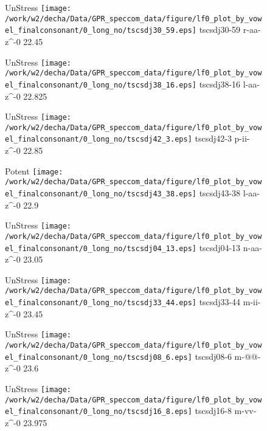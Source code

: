 \documentclass{article}
\begin{document}
\begin{figure}[t]
\begin{minipage}[b]{.24\textwidth}
UnStress
\centering
\texttt{[image: /work/w2/decha/Data/GPR\_speccom\_data/figure/lf0\_plot\_by\_vowel\_finalconsonant/0\_long\_no/tscsdj30\_59.eps]}
tscsdj30-59 r-aa-z\textasciicircum-0 22.45
\end{minipage}
\begin{minipage}[b]{.24\textwidth}
UnStress
\centering
\texttt{[image: /work/w2/decha/Data/GPR\_speccom\_data/figure/lf0\_plot\_by\_vowel\_finalconsonant/0\_long\_no/tscsdj38\_16.eps]}
tscsdj38-16 l-aa-z\textasciicircum-0 22.825
\end{minipage}
\begin{minipage}[b]{.24\textwidth}
UnStress
\centering
\texttt{[image: /work/w2/decha/Data/GPR\_speccom\_data/figure/lf0\_plot\_by\_vowel\_finalconsonant/0\_long\_no/tscsdj42\_3.eps]}
tscsdj42-3 p-ii-z\textasciicircum-0 22.85
\end{minipage}
\begin{minipage}[b]{.24\textwidth}
\colorbox{Apricot}{Potent}
\centering
\texttt{[image: /work/w2/decha/Data/GPR\_speccom\_data/figure/lf0\_plot\_by\_vowel\_finalconsonant/0\_long\_no/tscsdj43\_38.eps]}
tscsdj43-38 l-aa-z\textasciicircum-0 22.9
\end{minipage}
\end{figure}

\begin{figure}[t]
\begin{minipage}[b]{.24\textwidth}
UnStress
\centering
\texttt{[image: /work/w2/decha/Data/GPR\_speccom\_data/figure/lf0\_plot\_by\_vowel\_finalconsonant/0\_long\_no/tscsdj04\_13.eps]}
tscsdj04-13 n-aa-z\textasciicircum-0 23.05
\end{minipage}
\begin{minipage}[b]{.24\textwidth}
UnStress
\centering
\texttt{[image: /work/w2/decha/Data/GPR\_speccom\_data/figure/lf0\_plot\_by\_vowel\_finalconsonant/0\_long\_no/tscsdj33\_44.eps]}
tscsdj33-44 m-ii-z\textasciicircum-0 23.45
\end{minipage}
\begin{minipage}[b]{.24\textwidth}
UnStress
\centering
\texttt{[image: /work/w2/decha/Data/GPR\_speccom\_data/figure/lf0\_plot\_by\_vowel\_finalconsonant/0\_long\_no/tscsdj08\_6.eps]}
tscsdj08-6 m-@@-z\textasciicircum-0 23.6
\end{minipage}
\begin{minipage}[b]{.24\textwidth}
UnStress
\centering
\texttt{[image: /work/w2/decha/Data/GPR\_speccom\_data/figure/lf0\_plot\_by\_vowel\_finalconsonant/0\_long\_no/tscsdj16\_8.eps]}
tscsdj16-8 m-vv-z\textasciicircum-0 23.975
\end{minipage}
\end{figure}
\end{document}
